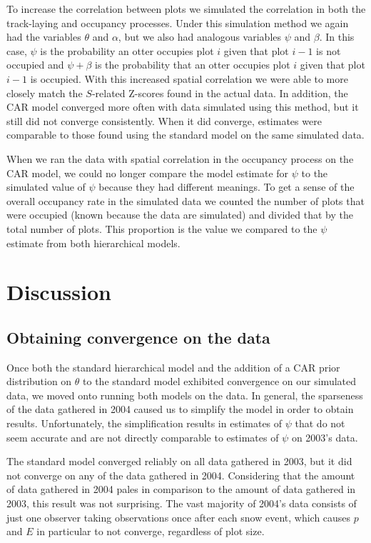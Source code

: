\documentclass[12pt]{article}
\begin{document}
    To increase the correlation between plots we simulated the correlation
    in both the track-laying and occupancy processes. Under this 
    simulation method we
    again had the variables $\theta$ and $\alpha$, but we also had analogous
    variables $ \psi$ and $\beta$. In this case, $\psi$ is the probability an
    otter occupies plot $i$ given that plot $i-1$ is not occupied and $\psi+
    \beta$ is the probability that an otter occupies plot $i$ given that plot
    $i-1$ is occupied. With this increased spatial correlation we were able to
    more closely match the $S$-related Z-scores found in the actual data. In
    addition, the CAR model converged more often with data simulated using this
    method, but it still did not converge consistently. When it did converge,
    estimates were comparable to those found using the standard model on the
    same simulated data.

    When we ran the data with spatial correlation in the occupancy process on
    the CAR model, we could no longer compare the model estimate for $\psi$ to
    the simulated value of $\psi$ because they had different meanings. To get a
    sense of the overall occupancy rate in the simulated data we counted the
    number of plots that were occupied (known because the data are simulated)
    and divided that by the total number of plots. This proportion is the value
    we compared to the $\psi$ estimate from both hierarchical models.

\section{Discussion}

    \subsection{Obtaining convergence on the data}
    Once both the standard hierarchical model and the addition of a CAR prior
    distribution on \(\theta\) to the standard model exhibited convergence on
    our simulated data, we moved onto running both models on the data.
    In general, the sparseness of the data gathered in 2004 caused us to
    simplify the model in order to obtain results. Unfortunately, the
    simplification results in estimates of \(\psi\) that do not seem accurate
    and are not directly comparable to estimates of \(\psi\) on 2003's data.

    The standard model converged reliably on all data gathered in 2003, but it
    did not converge on any of the data gathered in 2004. Considering that the
    amount of data gathered in 2004 pales in comparison to the amount of data
    gathered in 2003, this result was not surprising. The vast majority of
    2004's data consists of just one observer taking observations once after
    each snow event, which causes \(p\) and \(E\) in particular to not converge,
    regardless of plot size.
\end{document}
